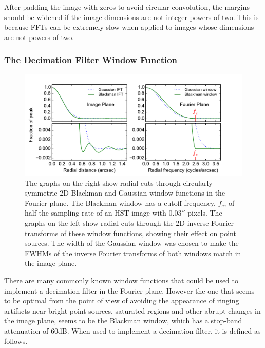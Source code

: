 \documentclass[12pt,twoside,a4paper]{article}
\newcommand{\arcsec}{''}
\begin{document}
After padding the image with zeros to avoid circular convolution, the
margins should be widened if the image dimensions are not integer
powers of two. This is because FFTs can be extremely slow when applied
to images whose dimensions are not powers of two.

\subsubsection{The Decimation Filter Window Function}

\begin{figure}[htbp]
\begin{center}
\begin{minipage}[b]{5.5in}
\begin{center}
\includegraphics[width=5.0in]{blackman_ift.pdf}
\caption{The graphs on the right show radial cuts through circularly
  symmetric 2D Blackman and Gaussian window functions in the Fourier
  plane. The Blackman window has a cutoff frequency, $f_c$, of half
  the sampling rate of an HST image with $0.03\arcsec$ pixels. The
  graphs on the left show radial cuts through the 2D inverse Fourier
  transforms of these window functions, showing their effect on point
  sources. The width of the Gaussian window was chosen to make the
  FWHMs of the inverse Fourier transforms of both windows match in the
  image plane.}
\label{blackman_ift_figure}
\end{center}
\end{minipage}
\end{center}
\end{figure}

There are many commonly known window functions that could be used to
implement a decimation filter in the Fourier plane. However the one
that seems to be optimal from the point of view of avoiding the
appearance of ringing artifacts near bright point sources, saturated
regions and other abrupt changes in the image plane, seems to be the
Blackman window, which has a stop-band attenuation of 60dB. When used
to implement a decimation filter, it is defined as follows.
\end{document}
